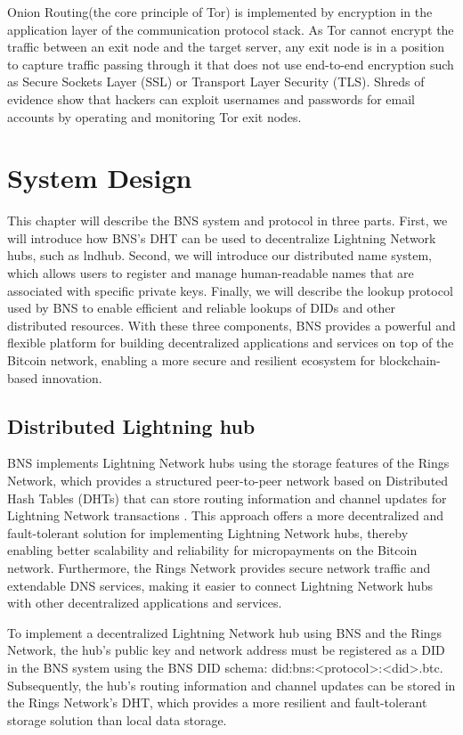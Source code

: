 \documentclass[twocolumn]{article}
\begin{document}
Onion Routing(the core principle of Tor\cite{TorNetwork}) is implemented by encryption in the application layer of the communication protocol stack. As Tor cannot encrypt the traffic between an exit node and the target server, any exit node is in a position to capture traffic passing through it that does not use end-to-end encryption such as Secure Sockets Layer (SSL) or Transport Layer Security (TLS). Shreds of evidence show that hackers can exploit usernames and passwords for email accounts by operating and monitoring Tor exit nodes.
\section{System Design}

This chapter will describe the BNS system and protocol in three parts. First, we will introduce how BNS's DHT can be used to decentralize Lightning Network hubs, such as lndhub. Second, we will introduce our distributed name system, which allows users to register and manage human-readable names that are associated with specific private keys. Finally, we will describe the lookup protocol used by BNS to enable efficient and reliable lookups of DIDs and other distributed resources. With these three components, BNS provides a powerful and flexible platform for building decentralized applications and services on top of the Bitcoin network, enabling a more secure and resilient ecosystem for blockchain-based innovation.

\subsection{Distributed Lightning hub}
BNS implements Lightning Network hubs using the storage features of the Rings Network, which provides a structured peer-to-peer network based on Distributed Hash Tables (DHTs) that can store routing information and channel updates for Lightning Network transactions \cite{BNS-usecases}. This approach offers a more decentralized and fault-tolerant solution for implementing Lightning Network hubs, thereby enabling better scalability and reliability for micropayments on the Bitcoin network. Furthermore, the Rings Network provides secure network traffic and extendable DNS services, making it easier to connect Lightning Network hubs with other decentralized applications and services.

To implement a decentralized Lightning Network hub using BNS and the Rings Network, the hub's public key and network address must be registered as a DID in the BNS system using the BNS DID schema: did:bns:<protocol>:<did>.btc. Subsequently, the hub's routing information and channel updates can be stored in the Rings Network's DHT, which provides a more resilient and fault-tolerant storage solution than local data storage.
\end{document}
